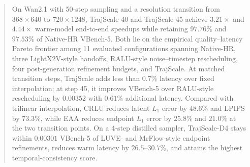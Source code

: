 \documentclass[letterpaper]{article} %
\begin{document}
\begin{abstract}
On Wan2.1 with 50-step sampling and a resolution transition from \(368\times640\) to \(720\times1248\), TrajScale-40 and TrajScale-45 achieve \(3.21\times\) and \(4.44\times\) warm-model end-to-end speedups while retaining \(97.76\%\) and \(97.53\%\) of Native-HR VBench-5. Both lie on the empirical quality--latency Pareto frontier among 11 evaluated configurations spanning Native-HR, three LightX2V-style handoffs, RALU-style noise--timestep rescheduling, four post-generation refinement budgets, and TrajScale. At matched transition steps, TrajScale adds less than \(0.7\%\) latency over fixed interpolation; at step 45, it improves VBench-5 over RALU-style rescheduling by \(0.00352\) with \(0.61\%\) additional latency. Compared with trilinear interpolation, CRLU reduces latent \(L_1\) error by \(48.6\%\) and LPIPS by \(73.3\%\), while EAA reduces endpoint \(L_1\) error by \(25.8\%\) and \(21.0\%\) at the two transition points. On a 4-step distilled sampler, TrajScale-D4 stays within \(0.00301\) VBench-5 of LUVE- and MrFlow-style endpoint refinements, reduces warm latency by \(26.5\)--\(30.7\%\), and attains the highest temporal-consistency score.
\end{abstract}




\end{document}
